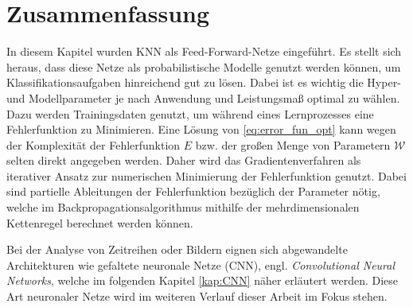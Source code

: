 \section{Zusammenfassung}
\label{abs:NN_conc}
In diesem Kapitel wurden KNN als Feed-Forward-Netze eingeführt. Es stellt sich heraus, dass diese Netze als probabilistische Modelle genutzt werden können, um Klassifikationsaufgaben hinreichend gut zu lösen. Dabei ist es wichtig die Hyper- und Modellparameter je nach Anwendung und Leistungsmaß optimal zu wählen. Dazu werden Trainingsdaten genutzt, um während eines Lernprozesses eine Fehlerfunktion zu Minimieren. Eine Lösung von \ref{eq:error_fun_opt} kann wegen der Komplexität der Fehlerfunktion $E$ bzw. der großen Menge von Parametern $\mathcal{W}$ selten direkt angegeben werden\cite{blum1992training}. Daher wird das Gradientenverfahren als iterativer Ansatz zur numerischen Minimierung der Fehlerfunktion genutzt. Dabei sind partielle Ableitungen der Fehlerfunktion bezüglich der Parameter nötig, welche im Backpropagationsalgorithmus mithilfe der mehrdimensionalen Kettenregel berechnet werden können. 

Bei der Analyse von Zeitreihen oder Bildern eignen sich abgewandelte Architekturen wie gefaltete neuronale Netze (CNN), engl. \textit{Convolutional Neural Networks}, welche im folgenden Kapitel \ref{kap:CNN} näher erläutert werden. Diese Art neuronaler Netze wird im weiteren Verlauf dieser Arbeit im Fokus stehen.


    





